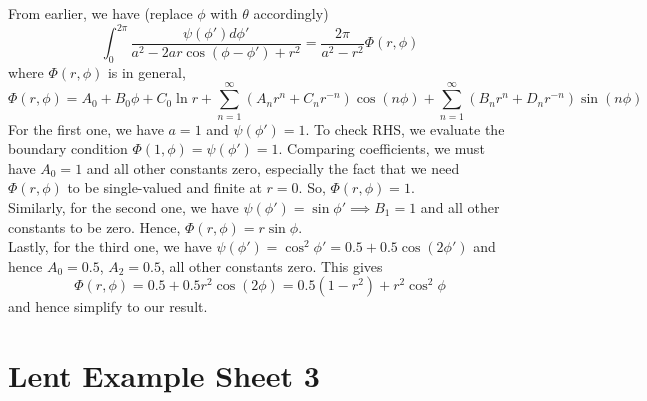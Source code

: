 \documentclass[a4paper]{article}
\begin{document}
\begin{ans}
From earlier, we have (replace $\phi$ with $\theta$ accordingly)
$$\int_0^{2\pi}\frac{\psi(\phi')d\phi'}{a^2-2ar\cos(\phi-\phi')+r^2}=\frac{2\pi}{a^2-r^2}\Phi(r,\phi)$$
where $\Phi(r,\phi)$ is in general,
$$\Phi(r,\phi)=A_0+B_0\phi+C_0\ln r+\sum_{n=1}^\infty(A_nr^n+C_nr^{-n})\cos(n\phi)+\sum_{n=1}^\infty(B_nr^n+D_nr^{-n})\sin(n\phi)$$
For the first one, we have $a=1$ and $\psi(\phi')=1$. To check RHS, we evaluate the boundary condition  $\Phi(1,\phi)=\psi(\phi')=1$. Comparing coefficients, we must have $A_0=1$ and all other constants zero, especially the fact that we need $\Phi(r,\phi)$ to be single-valued and finite at $r=0$. So, $\Phi(r,\phi)=1$.\\[5pt]
Similarly, for the second one, we have $\psi(\phi')=\sin\phi'\implies B_1=1$ and all other constants to be zero. Hence, $\Phi(r,\phi)=r\sin\phi$.\\[5pt]
Lastly, for the third one, we have $\psi(\phi')=\cos^2\phi'=0.5+0.5\cos(2\phi')$ and hence $A_0=0.5$, $A_2=0.5$, all other constants zero. This gives $$\Phi(r,\phi)=0.5+0.5r^2\cos(2\phi)=0.5(1-r^2)+r^2\cos^2\phi$$ and hence simplify to our result.
\end{ans}
\newpage
\section{Lent Example Sheet 3}
\end{document}
